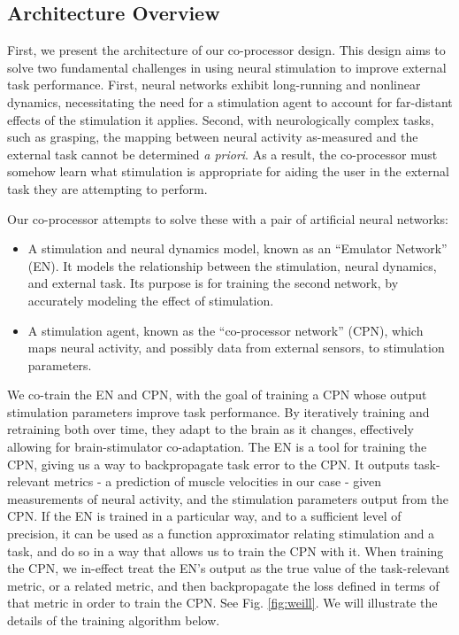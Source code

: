 \documentclass[12pt]{iopart}
\begin{document}
\subsection{Architecture Overview}
First, we present the architecture of our co-processor design. This design aims to solve two
fundamental challenges in using neural stimulation to improve external task performance.
First, neural networks exhibit long-running and nonlinear dynamics, necessitating
the need for a stimulation agent to account for far-distant effects of the stimulation it
applies. Second, with neurologically complex tasks, such as grasping, the mapping between
neural activity as-measured and the external task cannot be determined \textit{a priori}.
As a result, the co-processor must somehow learn what stimulation is appropriate for
aiding the user in the external task they are attempting to perform.

Our co-processor attempts to solve these with a pair of artificial neural networks:
\begin{itemize}
	\item A stimulation and neural dynamics model, known as an ``Emulator Network'' (EN). It models the relationship
	      between the stimulation, neural dynamics, and external task. Its purpose is for training the second network,
	      by accurately modeling the effect of stimulation.
	\item A stimulation agent, known as the ``co-processor network'' (CPN), which maps neural activity, and possibly
	      data from external sensors, to stimulation parameters.
\end{itemize}

We co-train the EN and CPN, with the goal of training a CPN whose output stimulation parameters
improve task performance. By iteratively training and retraining both over time, they adapt to
the brain as it changes, effectively allowing for brain-stimulator co-adaptation. The EN is a
tool for training the CPN, giving us a way to backpropagate task error to the CPN. It outputs
task-relevant metrics - a prediction of muscle velocities in our case - given measurements of neural
activity, and the stimulation parameters output from the CPN. If the EN is trained in a
particular way, and to a sufficient level of precision, it can be used as a function
approximator relating stimulation and a task, and do so in a way that allows us to train
the CPN with it. When training the CPN, we in-effect treat the EN's output as the true
value of the task-relevant metric, or a related metric, and then backpropagate the loss defined
in terms of that metric in order to train the CPN. See Fig. \ref{fig:weill}. We will illustrate
the details of the training algorithm below.
\end{document}
